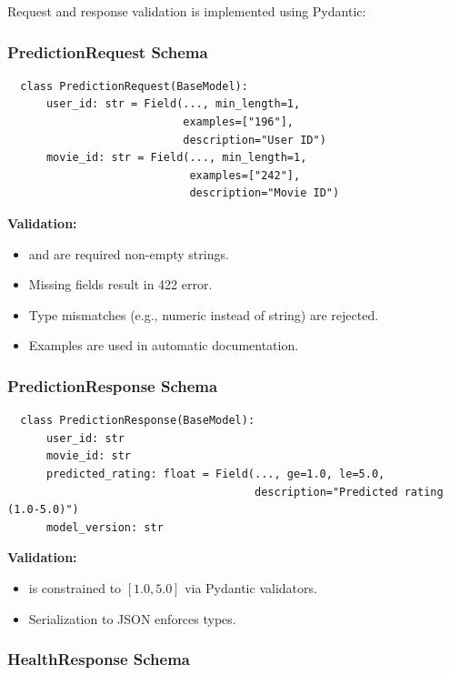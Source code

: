 Request and response validation is implemented using Pydantic:

\subsubsection{PredictionRequest Schema}

\begin{verbatim}
  class PredictionRequest(BaseModel):
      user_id: str = Field(..., min_length=1, 
                           examples=["196"],
                           description="User ID")
      movie_id: str = Field(..., min_length=1, 
                            examples=["242"],
                            description="Movie ID")
\end{verbatim}

\textbf{Validation:}
\begin{itemize}
  \item {} and  are required non-empty strings.
  \item Missing fields result in 422 error.
  \item Type mismatches (e.g., numeric instead of string) are rejected.
  \item Examples are used in automatic documentation.
\end{itemize}

\subsubsection{PredictionResponse Schema}

\begin{verbatim}
  class PredictionResponse(BaseModel):
      user_id: str
      movie_id: str
      predicted_rating: float = Field(..., ge=1.0, le=5.0,
                                      description="Predicted rating (1.0-5.0)")
      model_version: str
\end{verbatim}

\textbf{Validation:}
\begin{itemize}
  \item {} is constrained to $[1.0, 5.0]$ via Pydantic validators.
  \item Serialization to JSON enforces types.
\end{itemize}

\subsubsection{HealthResponse Schema}

